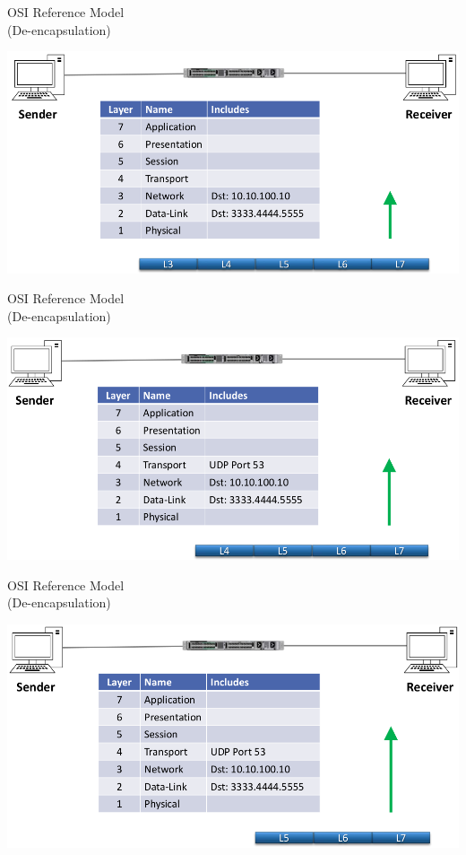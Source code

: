 \documentclass[pdflatex,compress,mathserif]{beamer}
\begin{document}
\begin{frame}{OSI Reference Model\\(De-encapsulation)}
	\begin{center}
		\includegraphics[width=\linewidth]{img/img31}
	\end{center}
\end{frame}

\begin{frame}{OSI Reference Model\\(De-encapsulation)}
	\begin{center}
		\includegraphics[width=\linewidth]{img/img32}
	\end{center}
\end{frame}

\begin{frame}{OSI Reference Model\\(De-encapsulation)}
	\begin{center}
		\includegraphics[width=\linewidth]{img/img33}
	\end{center}
\end{frame}
\end{document}
